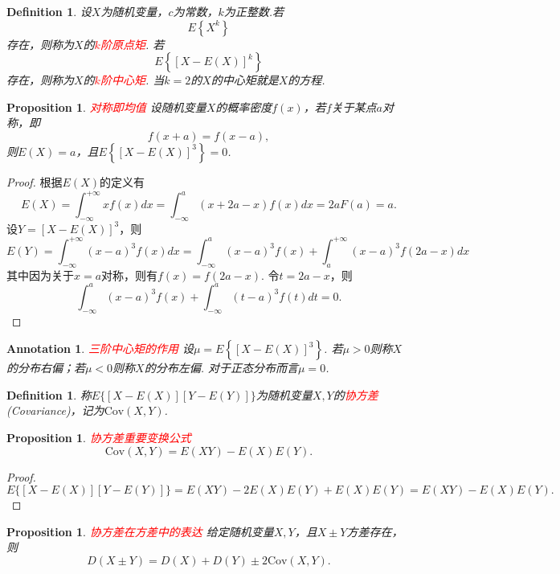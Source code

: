 \documentclass{article}
\newtheorem{proposition}[theorem]{Proposition}
\newtheorem{definition}[theorem]{Definition}
\newtheorem{annotation}[theorem]{Annotation}
\newcommand{\redt}[1]{\textcolor{red}{#1}}
\begin{document}
\begin{definition}
\rm 设$X$为随机变量，$c$为常数，$k$为正整数.若
$$
E \left\{ X^k \right\}
$$
存在，则称为$X$的\redt{$k$阶原点矩}. 若
$$
E \left\{ \left[X-E(X)\right]^k \right\}
$$
存在，则称为$X$的\redt{$k$阶中心矩}. 当$k=2$的$X$的中心矩就是$X$的方程. 
\end{definition}

\begin{proposition}\label{expectation-of-symmetry}
\rm \redt{对称即均值} 设随机变量$X$的概率密度$f(x)$，若$f$关于某点$a$对称，即
$$
f(x+a) = f(x-a),
$$
则$E(X) = a$，且$E \left\{ \left[X-E(X)\right]^3 \right\} = 0$.
\end{proposition}


\begin{proof}
根据$E(X)$的定义有
$$
E(X) = \int_{-\infty}^{+\infty}xf(x)dx = \int_{-\infty}^{a} (x + 2a-x)f(x)dx = 2aF(a) = a.
$$
设$Y = \left[X-E(X)\right]^3$，则
$$
E(Y) = \int_{-\infty}^{+\infty}(x-a)^3f(x)dx = \int_{-\infty}^a (x-a)^3f(x) + \int_{a}^{+\infty} (x-a)^3f(2a-x)dx
$$
其中因为关于$x=a$对称，则有$f(x) = f(2a-x)$. 令$t=2a-x$，则
$$
\int_{-\infty}^a (x-a)^3f(x) + \int_{-\infty}^{a} (t-a)^3f(t)dt = 0.
$$
\end{proof}

\begin{annotation}
\rm \redt{三阶中心矩的作用} 设$\mu = E \left\{ \left[X-E(X)\right]^3 \right\}$. 若$\mu > 0$则称$X$的分布右偏；若$\mu < 0$则称$X$的分布左偏. 对于正态分布而言$\mu = 0$. 
\end{annotation}

\begin{definition}
\rm 称$E\{[X-E(X)][Y-E(Y)]\}$为随机变量$X,Y$的\redt{协方差}(Covariance)，记为$\text{Cov}(X,Y)$.
\end{definition}

\begin{proposition}\label{cov: variate}
\rm \redt{协方差重要变换公式}
$$
\text{Cov}(X,Y) = E(XY) - E(X)E(Y).
$$
\end{proposition}

\begin{proof}
$$
E\{[X-E(X)][Y-E(Y)]\} = E(XY)-2E(X)E(Y) + E(X)E(Y) = E(XY)-E(X)E(Y).
$$
\end{proof}

\begin{proposition}
\rm \redt{协方差在方差中的表达} 给定随机变量$X,Y$，且$X \pm Y$方差存在，则
$$
D(X \pm Y)=D(X) + D(Y) \pm 2\text{Cov}(X,Y).
$$
\end{proposition}
\end{document}
